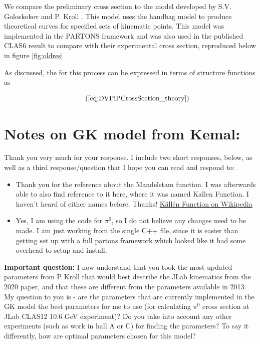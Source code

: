 We compare the preliminary cross section to the model developed by S.V. Goloskokov and P. Kroll \cite{Goloskokov2010AnElectroproduction}. This model uses the handbag model to produce theoretical curves for specified sets of kinematic points. This model was implemented in the PARTONS framework \cite{Berthou2018PARTONS:Software} and was also used in the published CLAS6 result to compare with their experimental cross section, reproduced below in figure \ref{fig:oldres} \cite{Bedlinskiy2014ExclusiveCLAS}

As discussed, the \xsec for this process can be expressed in terms of structure functions as 

    \begin{equation*}
         \recallLabel{eq:DVPiPCrossSection_theory}
    \end{equation*}

\section*{Notes on GK model from Kemal:}

Thank you very much for your response. I include two short responses, below, as well as a third response/question that I hope you can read and respond to: 

\begin{itemize}
    \item Thank you for the reference about the Mandelstam function. I was afterwards able to also find reference to it here, where it was named Kallen Function. I haven't heard of either names before. Thanks! \href{https://en.wikipedia.org/wiki/K%C3%A4ll%C3%A9n_function}{Källén Function on Wikipedia}

    \item Yes, I am using the code for $\pi^0$, so I do not believe any changes need to be made. I am just working from the single C++ file, since it is easier than getting set up with a full partons framework which looked like it had some overhead to setup and install.
\end{itemize}

\textbf{Important question:} I now understand that you took the most updated parameters from P Kroll that would best describe the JLab kinematics from the 2020 paper, and that these are different from the parameters available in 2013. My question to you is - are the parameters that are currently implemented in the GK model the best parameters for me to use (for calculating $\pi^0$ cross section at JLab CLAS12 10.6 GeV experiment)? Do you take into account any other experiments (such as work in hall A or C) for finding the parameters? To say it differently, how are optimal parameters chosen for this model?


